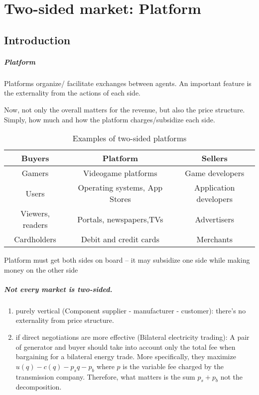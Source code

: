 \chapter{Two-sided market: Platform}
\section{Introduction}
\paragraph{Platform} Platforms organize/ facilitate exchanges between
agents. An important feature is the externality from the actions of each side.
\begin{remark}
    Now, not only the overall matters for the revenue, but also the price structure. Simply, how much and how the platform charges/subsidize each side.
\end{remark}
\begin{table}[!h]
	\centering
	\begin{tabular}{|c|c|c|}
        \hline
		Buyers           & Platform                      & Sellers         \\ \hline
		Gamers           & Videogame platforms           & Game developers \\ \hline
		Users            & Operating systems, App Stores &                 
		Application developers\\ \hline
		Viewers, readers & Portals, newspapers,TVs       & Advertisers     \\ \hline
		Cardholders      & Debit and credit cards        & Merchants       \\ \hline
	\end{tabular}
	\caption{Examples of two-sided platforms}
	\label{tab:two_sided_market}
\end{table}
\begin{remark}
    Platform must get both sides on board -- it may subsidize one side while making money on the other side
\end{remark}

\paragraph{Not every market is two-sided.} 
\begin{enumerate}
    \item purely vertical (Component supplier - manufacturer - customer): there's no externality from price structure.
    \item if direct negotiations are more effective (Bilateral electricity trading): A pair of generator and buyer should take into account only the total fee when bargaining for a bilateral energy trade. More specifically, they maximize $u(q)-c(q)-p_sq-p_b$ where $p$ is the variable fee charged by the transmission company. Therefore, what matters is the sum $p_s+p_b$ not the decomposition.
\end{enumerate}

